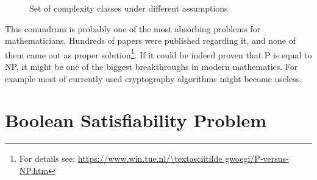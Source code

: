 \documentclass[12pt,english,pdflatex]{aghdpl}
\begin{document}
\begin{figure}[H]
\begin{minipage}[t]{0.4\columnwidth}%
%
\end{minipage}\hfill{}%
\begin{minipage}[t]{0.45\columnwidth}%
%
\end{minipage}
\caption{Set of complexity classes under different assumptions}
\end{figure}

This conundrum is probably one of the most absorbing problems for
mathematicians. Hundreds of papers were published regarding it, and
none of them came out as proper solution\footnote{For details see: \url{https://www.win.tue.nl/\textasciitilde gwoegi/P-versus-NP.htm}}.
If it could be indeed proven that P is equal to NP, it might be one
of the biggest breakthroughs in modern mathematics. For example most of currently
used cryptography algorithms might become useless.

\section{Boolean Satisfiability Problem}
\label{sec:BSP}
\end{document}
